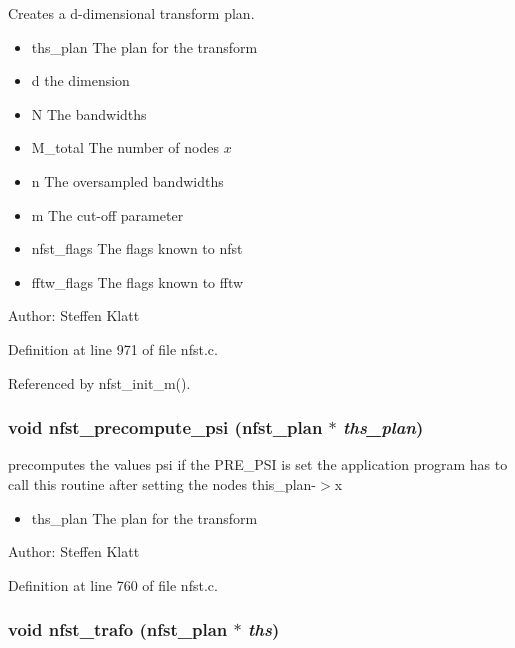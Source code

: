 Creates a d-dimensional transform plan. 

\begin{itemize}
\item ths\_\-plan The plan for the transform \item d the dimension \item N The bandwidths \item M\_\-total The number of nodes $x$ \item n The oversampled bandwidths \item m The cut-off parameter \item nfst\_\-flags The flags known to nfst \item fftw\_\-flags The flags known to fftw\end{itemize}
\begin{Desc}
\item[Author:]Steffen Klatt \end{Desc}


Definition at line 971 of file nfst.c.

Referenced by nfst\_\-init\_\-m().\hypertarget{group__nfsct_g0580a0aa2d426835b618b564b5ef3387}{
\subsubsection{\setlength{\rightskip}{0pt plus 5cm}void nfst\_\-precompute\_\-psi ({\bf nfst\_\-plan} $\ast$ {\em ths\_\-plan})}}
\label{group__nfsct_g0580a0aa2d426835b618b564b5ef3387}


precomputes the values psi if the PRE\_\-PSI is set the application program has to call this routine after setting the nodes this\_\-plan-$>$x 

\begin{itemize}
\item ths\_\-plan The plan for the transform\end{itemize}
\begin{Desc}
\item[Author:]Steffen Klatt \end{Desc}


Definition at line 760 of file nfst.c.\hypertarget{group__nfsct_gc80b86521428ec2191919cc96c82f416}{
\subsubsection{\setlength{\rightskip}{0pt plus 5cm}void nfst\_\-trafo ({\bf nfst\_\-plan} $\ast$ {\em ths})}}
\label{group__nfsct_gc80b86521428ec2191919cc96c82f416}


